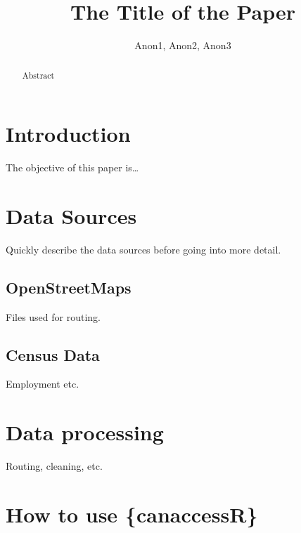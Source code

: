 \documentclass[Royal,times,sageh]{sagej}
\begin{document}

\title{The Title of the Paper}

\runninghead{}

\author{Anon1\affilnum{}, Anon2\affilnum{}, Anon3\affilnum{}}

\affiliation{\affilnum{}{}}



\begin{abstract}
Abstract
\end{abstract}


\maketitle

\section{Introduction}\label{introduction}

The objective of this paper is\ldots{}

\section{Data Sources}\label{data-sources}

Quickly describe the data sources before going into more detail.

\subsection{OpenStreetMaps}\label{openstreetmaps}

Files used for routing.

\subsection{Census Data}\label{census-data}

Employment etc.

\section{Data processing}\label{data-processing}

Routing, cleaning, etc.

\section{How to use \{canaccessR\}}\label{how-to-use-canaccessr}
\end{document}

